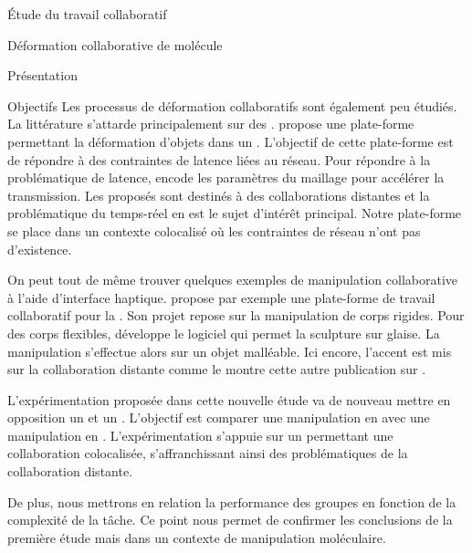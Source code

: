 \documentclass[myfrancais]{mythesis}
\begin{document}
\begin{mypart}{Étude du travail collaboratif}
\begin{mychapter}{Déformation collaborative de molécule}
\begin{mysection}{Présentation}
\begin{mysubsection}{Objectifs}
					Les processus de déformation collaboratifs sont également peu étudiés.
					La littérature s'attarde principalement sur des .
					 propose une plate-forme permettant la déformation d'objets dans un .
					L'objectif de cette plate-forme est de répondre à des contraintes de latence liées au réseau.
					Pour répondre à la problématique de latence,  encode les paramètres du maillage pour accélérer la transmission.
					Les  proposés sont destinés à des collaborations distantes et la problématique du temps-réel en est le sujet d'intérêt principal.
					Notre plate-forme se place dans un contexte colocalisé où les contraintes de réseau n'ont pas d'existence.

					On peut tout de même trouver quelques exemples de manipulation collaborative à l'aide d'interface haptique.
					 propose par exemple une plate-forme de travail collaboratif pour la .
					Son projet repose sur la manipulation de corps rigides.
					Pour des corps flexibles,  développe le logiciel \myClayWorks qui permet la sculpture sur glaise.
					La manipulation s'effectue alors sur un objet malléable.
					Ici encore, l'accent est mis sur la collaboration distante comme le montre cette autre publication sur \myClayWorks {}.

					L'expérimentation proposée dans cette nouvelle étude va de nouveau mettre en opposition un  et un .
					L'objectif est comparer une manipulation  en  avec une manipulation  en .
					L'expérimentation s'appuie sur un  permettant une collaboration colocalisée, s'affranchissant ainsi des problématiques de la collaboration distante.

					De plus, nous mettrons en relation la performance des groupes en fonction de la complexité de la tâche.
					Ce point nous permet de confirmer les conclusions de la première étude mais dans un contexte de manipulation moléculaire.


\end{mysubsection}
\end{mysection}
\end{mychapter}
\end{mypart}
\end{document}
